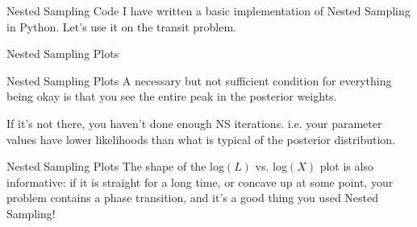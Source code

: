 \documentclass{beamer}
\begin{document}
\begin{frame}[t]{Nested Sampling Code}
I have written a basic implementation of Nested Sampling in Python. Let's
use it on the transit problem.

\end{frame}

\begin{frame}[t]{Nested Sampling Plots}
\vspace{-10pt}

\end{frame}

\begin{frame}[t]{Nested Sampling Plots}
A necessary but not sufficient condition for everything being okay is that you
see the entire peak in the posterior weights.\\

\vspace{20pt}

If it's not there, you haven't done enough NS iterations. i.e. your parameter
values have lower likelihoods than what is typical of the posterior distribution.
\end{frame}

\begin{frame}[t]{Nested Sampling Plots}
The shape of the log$(L)$ vs. log$(X)$ plot is also informative: if it is
straight for a long time, or concave up at some point, your problem contains
a phase transition, and it's a good thing you used Nested Sampling!
\end{frame}
\end{document}
